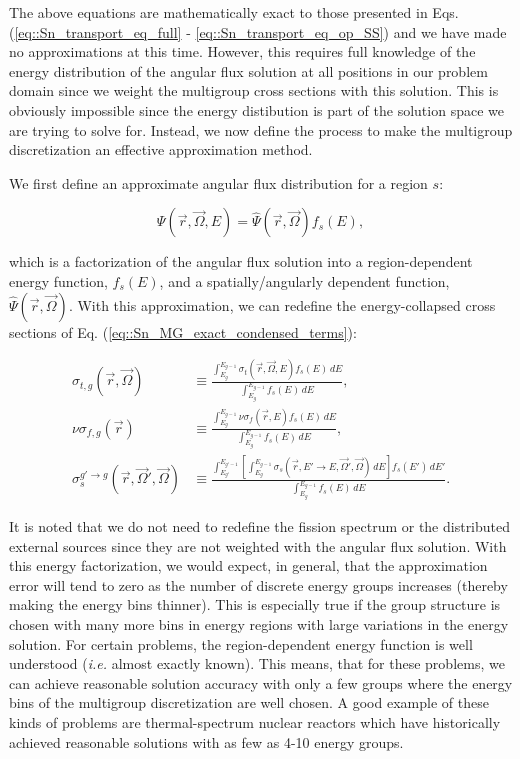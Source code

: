 The above equations are mathematically exact to those presented in Eqs. (\ref{eq::Sn_transport_eq_full} - \ref{eq::Sn_transport_eq_op_SS}) and we have made no approximations at this time. However, this requires full knowledge of the energy distribution of the angular flux solution at all positions in our problem domain since we weight the multigroup cross sections with this solution. This is obviously impossible since the energy distibution is part of the solution space we are trying to solve for. Instead, we now define the process to make the multigroup discretization an effective approximation method.

We first define an approximate angular flux distribution for a region $s$:

\begin{equation}
\label{eq::Sn_MG_flux_approx}
\Psi (\vec{r},\vec{\Omega}, E) =  \hat{\Psi} (\vec{r},\vec{\Omega}) f_{s} (E) ,
\end{equation}

\noindent which is a factorization of the angular flux solution into a region-dependent energy function, $f_s (E)$, and a spatially/angularly dependent function, $\hat{\Psi} (\vec{r},\vec{\Omega})$. With this approximation, we can redefine the energy-collapsed cross sections of Eq. (\ref{eq::Sn_MG_exact_condensed_terms}):

\begin{equation}
\label{eq::MG_approx_condensed_terms}
\begin{aligned}
\sigma_{t,g} (\vec{r},\vec{\Omega}) & \equiv \frac{\int_{E_{g}}^{E_{g-1}} \sigma_{t} (\vec{r},\vec{\Omega},E) f_{s} (E) \, dE}{\int_{E_{g}}^{E_{g-1}} f_{s} (E) \, dE} ,\\
\nu\sigma_{f,g} (\vec{r}) & \equiv \frac{\int_{E_{g}}^{E_{g-1}} \nu\sigma_{f} (\vec{r},E)  f_{s} (E) \, dE }{\int_{E_{g}}^{E_{g-1}} f_{s} (E) \, dE}, \\
\sigma_{s}^{g' \rightarrow g} (\vec{r},\vec{\Omega}' , \vec{\Omega} ) & \equiv \frac{\int_{E_{g'}}^{E_{g'-1}} \left[ \int_{E_{g}}^{E_{g-1}} \sigma_s (\vec{r},E' \rightarrow E,\vec{\Omega}' , \vec{\Omega} ) \, dE \right] f_{s} (E')\, dE' }{\int_{E_{g}}^{E_{g-1}}  f_{s} (E) \, dE} .
\end{aligned}
\end{equation}

\noindent It is noted that we do not need to redefine the fission spectrum or the distributed external sources since they are not weighted with the angular flux solution. With this energy factorization, we would expect, in general, that the approximation error will tend to zero as the number of discrete energy groups increases (thereby making the energy bins thinner). This is especially true if the group structure is chosen with many more bins in energy regions with large variations in the energy solution. For certain problems, the region-dependent energy function is well understood ({\em i.e.} almost exactly known). This means, that for these problems, we can achieve reasonable solution accuracy with only a few groups where the energy bins of the multigroup discretization are well chosen. A good example of these kinds of problems are thermal-spectrum nuclear reactors which have historically achieved reasonable solutions with as few as 4-10 energy groups.

